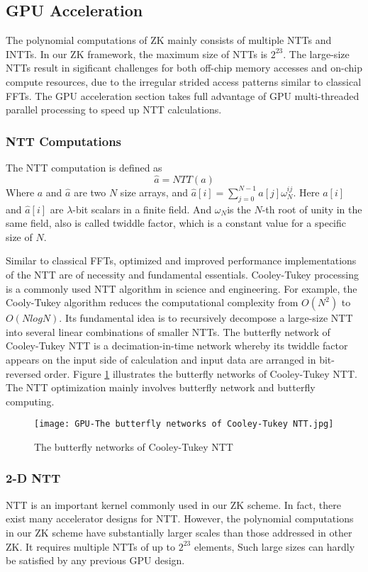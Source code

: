 \subsection{GPU Acceleration}\label{section: gpu-acceleration}
The polynomial computations of ZK mainly consists of multiple NTTs and INTTs. In our ZK framework, the maximum size of NTTs is $2^{23}$. The large-size NTTs result in sigificant challenges for both off-chip memory accesses and on-chip compute resources, due to the irregular strided access patterns similar to classical FFTs. The GPU acceleration section takes full advantage of GPU multi-threaded parallel processing to speed up NTT calculations.
\subsubsection{NTT Computations}
The NTT computation is defined as
\[\hat{a} = NTT{(a)}\]
Where $a$ and  $\hat{a}$ are two $N$ size arrays, and  $\hat{a}[i] = \sum_{j=0}^{N-1} a[j] \omega_N^{ij}$. Here $a[i]$ and $\hat{a}[i]$ are $\lambda$-bit scalars in a finite field. And $\omega_N$is the $N$-th root of unity in the same field, also is called twiddle factor, which is a constant value for a specific size of $N$.

Similar to classical FFTs, optimized and improved performance implementations of the NTT are of necessity and fundamental essentials. Cooley-Tukey processing is a commonly used NTT algorithm in science and engineering. For example, the Cooly-Tukey algorithm reduces the computational complexity from $O(N^2)$ to $O(NlogN)$. Its fundamental idea is to recursively decompose a large-size NTT into several linear combinations of smaller NTTs. The butterfly network of Cooley-Tukey NTT is a decimation-in-time network whereby its twiddle factor appears on the input side of calculation and input data are arranged in bit-reversed order. Figure \ref{fig:The Butterfly Networks of Cooley-Tukey NTT} illustrates the butterfly networks of Cooley-Tukey NTT. The NTT optimization mainly involves butterfly network and butterfly computing.
\begin{figure}[!ht]
    \centering
    \texttt{[image: GPU-The butterfly networks of Cooley-Tukey NTT.jpg]}
    \caption{The butterfly networks of Cooley-Tukey NTT}
    \label{fig:The Butterfly Networks of Cooley-Tukey NTT}
\end{figure}
\subsubsection{2-D NTT}
NTT is an important kernel commonly used in our ZK scheme. In fact, there exist many accelerator designs for NTT. However, the polynomial computations in our ZK scheme have substantially larger scales than those addressed in other ZK. It requires multiple NTTs of up to $2^{23}$ elements, Such large sizes can hardly be satisfied by any previous GPU design.

